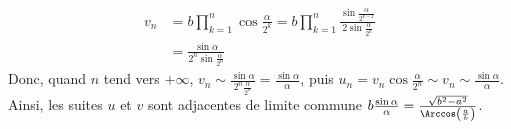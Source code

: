 {{\begin{align*}
v_n&=b\prod_{k=1}^{n}\cos\frac{\alpha}{2^k}=b\prod_{k=1}^{n}\frac{\sin\frac{\alpha}{2^{k-1}}}
{2\sin\frac{\alpha}{2^k}}\\
 &=\frac{\sin\alpha}{2^n\sin\frac{\alpha}{2^n}}
\end{align*}
Donc, quand $n$ tend vers $+\infty$, $v_n\sim\frac{\sin\alpha}{2^n\frac{\alpha}{2^n}}=\frac{\sin\alpha}{\alpha}$, puis $u_n=v_n\cos\frac{\alpha}{2^n}\sim v_n\sim\frac{\sin\alpha}{\alpha}$.
Ainsi, les suites $u$ et $v$ sont adjacentes de limite commune $b\frac{\sin\alpha}{\alpha}=\frac{\sqrt{b^2-a^2}}{\Arccos\left(\frac{a}{b}\right)}$.
}
}
